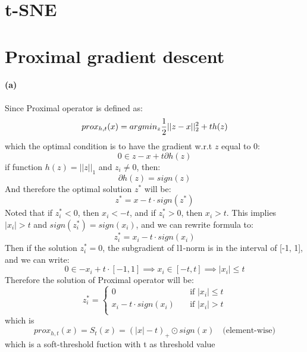 \documentclass{article}
\begin{document}
\section{t-SNE}
\section{Proximal gradient descent}
\paragraph{(a)} Since Proximal operator is defined as:
\begin{equation}
prox_{h,t}(x) = argmin_z{1\over2}||z-x||_2^2 + th(z)
\end{equation}
which the optimal condition is to have the gradient w.r.t $z$ equal to 0:
\begin{equation}
0 \in z-x+t\partial h(z)
\end{equation}
if function $h(z)=||z||_1$ and $z_i \neq 0$, then:
\begin{equation}
\partial h(z) = sign(z)
\end{equation}
And therefore the optimal solution $z^\ast$ will be:
\begin{equation}
z^\ast = x - t\cdot sign(z^\ast)
\end{equation}
Noted that if $z_i^\ast<0$, then $x_i<-t$, and if $z_i^\ast>0$, then $x_i>t$. This implies $|x_i|>t$ and $sign(z_i^\ast) = sign(x_i)$, and we can rewrite formula to:
\begin{equation}
z_i^\ast = x_i - t\cdot sign(x_i)
\end{equation}
Then if the solution $z_i^\ast=0$, the subgradient of l1-norm is in the interval of [-1, 1], and we can write:
\begin{equation}
0 \in -x_i + t \cdot [-1,1] \implies x_i \in [-t, t] \implies |x_i| \leq t
\end{equation}
Therefore the solution of Proximal operator will be:
\begin{equation}
z_i^\ast = \begin{cases}
    0       & \quad \text{if } |x_i|\leq t\\
    x_i - t \cdot sign(x_i)  & \quad \text{if } |x_i|>t\\
  \end{cases}
\end{equation}
which is
\begin{equation}
prox_{h,t}(x) = S_t(x) = (|x|-t)_+\odot sign(x) \quad \text{(element-wise)}
\end{equation}
which is a soft-threshold fuction with t as threshold value\\
\end{document}
